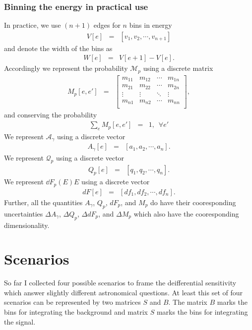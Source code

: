 \documentclass{article}%
\begin{document}
\subsubsection*{Binning the energy in practical use}
%
In practice, we use $(n+1)$ edges for $n$ bins in energy
%
\begin{eqnarray*}
V[e] &=& [v_1, v_2, \cdots, v_{n+1}]
\end{eqnarray*}
%
and denote the width of the bins as
%
\begin{eqnarray*}
W[e] &=& V[e+1] - V[e].
\end{eqnarray*}
%
Accordingly we represent the probability $\mathcal{M}_p$ using a discrete matrix
%
\begin{eqnarray*}
M_p[e, e'] &=&
  \left[ {\begin{array}{cccc}
    m_{11} & m_{12} & \cdots & m_{1n}\\
    m_{21} & m_{22} & \cdots & m_{2n}\\
    \vdots & \vdots & \ddots & \vdots\\
    m_{n1} & m_{n2} & \cdots & m_{nn}\\
  \end{array} } \right],
\end{eqnarray*}
%
and conserving the probability
%
\begin{eqnarray*}
\sum_{e} M_p[e, e'] &=& 1, \, \, \, \forall e'
\end{eqnarray*}
%
We represent $\mathcal{A}_\gamma$ using a discrete vector
%
\begin{eqnarray*}
A_\gamma[e] &=& [a_1, a_2, \cdots, a_n].
\end{eqnarray*}
%
We represent $\mathcal{Q}_p$ using a discrete vector
%
\begin{eqnarray*}
Q_p[e] &=& [q_1, q_2, \cdots, q_n].
\end{eqnarray*}
%
We represent $\dd{F_p(E)}{E}$ using a discrete vector
%
\begin{eqnarray*}
dF[e] &=& [df_1, df_2, \cdots, df_n].
\end{eqnarray*}
%
Further, all the quantities $A_\gamma$, $Q_p$, $dF_p$, and $M_p$ do have their cooresponding uncertainties $\Delta A_\gamma$, $\Delta Q_p$, $\Delta dF_p$, and $\Delta M_p$ which also have the cooresponding dimensionality.
%
\section{Scenarios}
%
So far I collected four possible scenarios to frame the deifferential sensitivity which answer slightly different astronomical questions.
%
At least this set of four scenarios can be represented by two matrices $S$ and $B$.
%
The matrix $B$ marks the bins for integrating the background and matrix $S$ marks the bins for integrating the signal.
%
\end{document}
